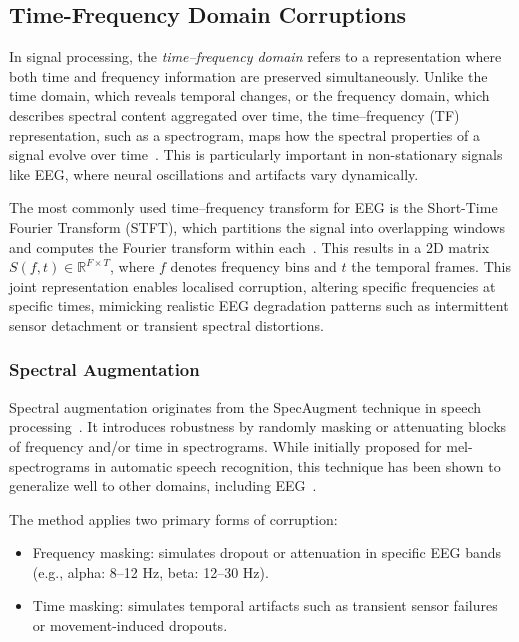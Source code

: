 \subsection{Time-Frequency Domain Corruptions}
In signal processing, the \textit{time–frequency domain} refers to a representation where both time and frequency information are preserved simultaneously. Unlike the time domain, which reveals temporal changes, or the frequency domain, which describes spectral content aggregated over time, the time–frequency (TF) representation, such as a spectrogram, maps how the spectral properties of a signal evolve over time~\cite{timefreq}. This is particularly important in non-stationary signals like EEG, where neural oscillations and artifacts vary dynamically.

The most commonly used time–frequency transform for EEG is the Short-Time Fourier Transform (STFT), which partitions the signal into overlapping windows and computes the Fourier transform within each~\cite{timefreq}. This results in a 2D matrix \( S(f, t) \in \mathbb{R}^{F \times T} \), where \( f \) denotes frequency bins and \( t \) the temporal frames. This joint representation enables localised corruption, altering specific frequencies at specific times, mimicking realistic EEG degradation patterns such as intermittent sensor detachment or transient spectral distortions.

\subsubsection{Spectral Augmentation}
Spectral augmentation originates from the SpecAugment technique in speech processing~\cite{spectral_aug}. It introduces robustness by randomly masking or attenuating blocks of frequency and/or time in spectrograms. While initially proposed for mel-spectrograms in automatic speech recognition, this technique has been shown to generalize well to other domains, including EEG~\cite{spectral_aug}.

The method applies two primary forms of corruption:

\begin{itemize}
    \item Frequency masking: simulates dropout or attenuation in specific EEG bands (e.g., alpha: 8–12 Hz, beta: 12–30 Hz).
    \item Time masking: simulates temporal artifacts such as transient sensor failures or movement-induced dropouts.
\end{itemize}

